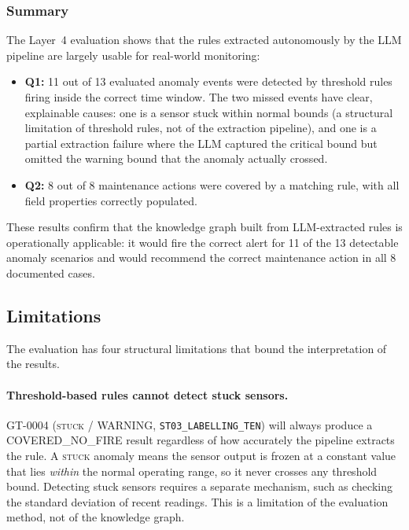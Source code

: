 ﻿\documentclass[11pt]{article}
\begin{document}
\subsubsection{Summary}

The Layer~4 evaluation shows that the rules extracted autonomously by the LLM
pipeline are largely usable for real-world monitoring:

\begin{itemize}
  \item \textbf{Q1:} 11 out of 13 evaluated anomaly events were detected by
        threshold rules firing inside the correct time window.  The two missed
        events have clear, explainable causes: one is a sensor stuck within
        normal bounds (a structural limitation of threshold rules, not of the
        extraction pipeline), and one is a partial extraction failure where
        the LLM captured the critical bound but omitted the warning bound that
        the anomaly actually crossed.

  \item \textbf{Q2:} 8 out of 8 maintenance actions were covered by a matching
        rule, with all field properties correctly populated.
\end{itemize}

These results confirm that the knowledge graph built from LLM-extracted rules
is operationally applicable: it would fire the correct alert for 11 of the 13
detectable anomaly scenarios and would recommend the correct maintenance action
in all 8 documented cases.

\subsection{Limitations}
\label{sec:layer4_limitations}

The evaluation has four structural limitations that bound the interpretation
of the results.

\paragraph{Threshold-based rules cannot detect stuck sensors.}
GT-0004 (\textsc{stuck} / WARNING, \texttt{ST03\_LABELLING\_TEN}) will always
produce a COVERED\_NO\_FIRE result regardless of how accurately the pipeline
extracts the rule.
A \textsc{stuck} anomaly means the sensor output is frozen at a constant value
that lies \emph{within} the normal operating range, so it never crosses any
threshold bound.
Detecting stuck sensors requires a separate mechanism, such as checking the
standard deviation of recent readings.
This is a limitation of the evaluation method, not of the knowledge graph.
\end{document}
